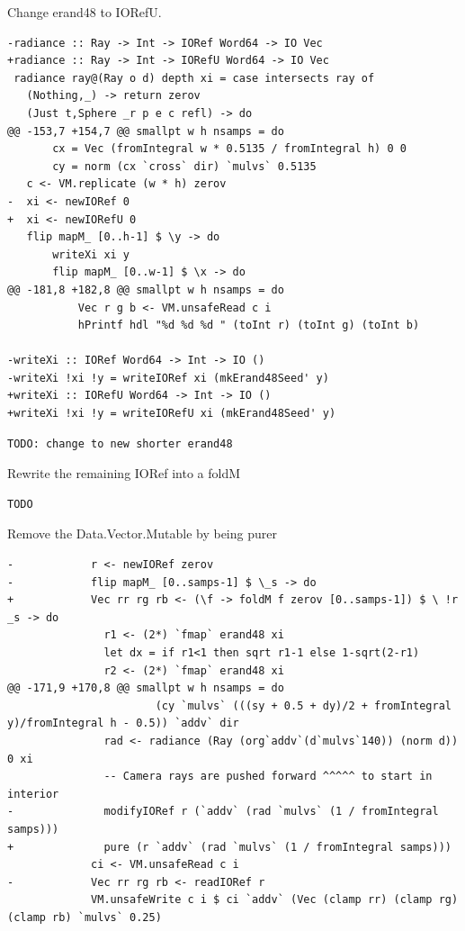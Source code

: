 \documentclass[8pt]{beamer}
\begin{document}
\begin{frame}[fragile]{Change erand48 to IORefU.}

\begin{verbatim}
-radiance :: Ray -> Int -> IORef Word64 -> IO Vec
+radiance :: Ray -> Int -> IORefU Word64 -> IO Vec
 radiance ray@(Ray o d) depth xi = case intersects ray of
   (Nothing,_) -> return zerov
   (Just t,Sphere _r p e c refl) -> do
@@ -153,7 +154,7 @@ smallpt w h nsamps = do
       cx = Vec (fromIntegral w * 0.5135 / fromIntegral h) 0 0
       cy = norm (cx `cross` dir) `mulvs` 0.5135
   c <- VM.replicate (w * h) zerov
-  xi <- newIORef 0
+  xi <- newIORefU 0
   flip mapM_ [0..h-1] $ \y -> do
       writeXi xi y
       flip mapM_ [0..w-1] $ \x -> do
@@ -181,8 +182,8 @@ smallpt w h nsamps = do
           Vec r g b <- VM.unsafeRead c i
           hPrintf hdl "%d %d %d " (toInt r) (toInt g) (toInt b)
 
-writeXi :: IORef Word64 -> Int -> IO ()
-writeXi !xi !y = writeIORef xi (mkErand48Seed' y)
+writeXi :: IORefU Word64 -> Int -> IO ()
+writeXi !xi !y = writeIORefU xi (mkErand48Seed' y)
\end{verbatim}
\begin{verbatim}
TODO: change to new shorter erand48
\end{verbatim}
\end{frame}


\begin{frame}[fragile]{Rewrite the remaining IORef into a foldM}
\begin{verbatim}
TODO
\end{verbatim}
\end{frame}


\begin{frame}[fragile]{Remove the Data.Vector.Mutable by being purer}
\begin{verbatim}
-            r <- newIORef zerov
-            flip mapM_ [0..samps-1] $ \_s -> do
+            Vec rr rg rb <- (\f -> foldM f zerov [0..samps-1]) $ \ !r _s -> do
               r1 <- (2*) `fmap` erand48 xi
               let dx = if r1<1 then sqrt r1-1 else 1-sqrt(2-r1)
               r2 <- (2*) `fmap` erand48 xi
@@ -171,9 +170,8 @@ smallpt w h nsamps = do
                       (cy `mulvs` (((sy + 0.5 + dy)/2 + fromIntegral y)/fromIntegral h - 0.5)) `addv` dir
               rad <- radiance (Ray (org`addv`(d`mulvs`140)) (norm d)) 0 xi
               -- Camera rays are pushed forward ^^^^^ to start in interior
-              modifyIORef r (`addv` (rad `mulvs` (1 / fromIntegral samps)))
+              pure (r `addv` (rad `mulvs` (1 / fromIntegral samps)))
             ci <- VM.unsafeRead c i
-            Vec rr rg rb <- readIORef r
             VM.unsafeWrite c i $ ci `addv` (Vec (clamp rr) (clamp rg) (clamp rb) `mulvs` 0.25)
\end{verbatim}
\end{frame}
\end{document}
